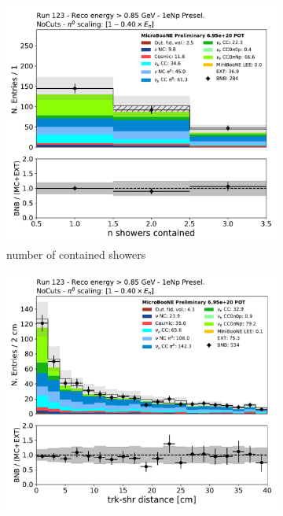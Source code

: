 \begin{figure}[H] 
\begin{center}
    \begin{subfigure}[b]{0.45\textwidth}
    \centering
    \includegraphics[width=1.00\textwidth]{egamma/n_showers_contained_run123_trkpid_lt_m01_tkshdistance_lt_10cm.pdf}
    \caption{\label{fig:nshowersdata} number of contained showers}
    \end{subfigure}
    \begin{subfigure}[b]{0.45\textwidth}
    \centering
    \includegraphics[width=1.00\textwidth]{egamma/tksh_distance_run123_trkpid_lt_m01.pdf}

\end{subfigure}
\end{center}
\end{figure}
